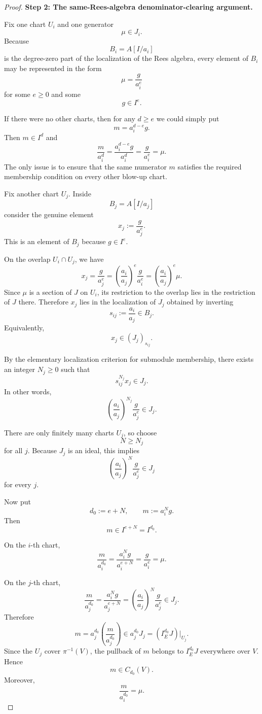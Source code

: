 \documentclass[11pt]{article}
\begin{document}
\begin{proof}
\medskip

\noindent
\textbf{Step 2: The same-Rees-algebra denominator-clearing argument.}

Fix one chart $U_i$ and one generator
\[
  \mu\in J_i.
\]
Because
\[
  B_i=A[I/a_i]
\]
is the degree-zero part of the localization of the Rees algebra, every element
of $B_i$ may be represented in the form
\[
  \mu=\frac{g}{a_i^e}
\]
for some $e\geq 0$ and some
\[
  g\in I^e.
\]

If there were no other charts, then for any $d\geq e$ we could simply put
\[
  m=a_i^{d-e}g.
\]
Then $m\in I^d$ and
\[
  \frac{m}{a_i^d}
  =
  \frac{a_i^{d-e}g}{a_i^d}
  =
  \frac{g}{a_i^e}
  =
  \mu.
\]
The only issue is to ensure that the same numerator $m$ satisfies the
required membership condition on every other blow-up chart.

Fix another chart $U_j$.
Inside
\[
  B_j=A[I/a_j]
\]
consider the genuine element
\[
  x_j:=\frac{g}{a_j^e}.
\]
This is an element of $B_j$ because $g\in I^e$.

On the overlap $U_i\cap U_j$, we have
\[
  x_j
  =
  \frac{g}{a_j^e}
  =
  \left(\frac{a_i}{a_j}\right)^e
  \frac{g}{a_i^e}
  =
  \left(\frac{a_i}{a_j}\right)^e\mu.
\]
Since $\mu$ is a section of $J$ on $U_i$, its restriction to the overlap lies
in the restriction of $J$ there.
Therefore $x_j$ lies in the localization of $J_j$ obtained by inverting
\[
  s_{ij}:=\frac{a_i}{a_j}\in B_j.
\]
Equivalently,
\[
  x_j\in (J_j)_{s_{ij}}.
\]

By the elementary localization criterion for submodule membership, there
exists an integer $N_j\geq 0$ such that
\[
  s_{ij}^{N_j}x_j\in J_j.
\]
In other words,
\[
  \left(\frac{a_i}{a_j}\right)^{N_j}
  \frac{g}{a_j^e}
  \in J_j.
\]

There are only finitely many charts $U_j$, so choose
\[
  N\geq N_j
\]
for all $j$.
Because $J_j$ is an ideal, this implies
\[
  \left(\frac{a_i}{a_j}\right)^N
  \frac{g}{a_j^e}
  \in J_j
\]
for every $j$.

Now put
\[
  d_0:=e+N,
  \qquad
  m:=a_i^Ng.
\]
Then
\[
  m\in I^{e+N}=I^{d_0}.
\]

On the $i$-th chart,
\[
  \frac{m}{a_i^{d_0}}
  =
  \frac{a_i^Ng}{a_i^{e+N}}
  =
  \frac{g}{a_i^e}
  =
  \mu.
\]

On the $j$-th chart,
\[
  \frac{m}{a_j^{d_0}}
  =
  \frac{a_i^Ng}{a_j^{e+N}}
  =
  \left(\frac{a_i}{a_j}\right)^N
  \frac{g}{a_j^e}
  \in J_j.
\]
Therefore
\[
  m
  =
  a_j^{d_0}
  \left(\frac{m}{a_j^{d_0}}\right)
  \in
  a_j^{d_0}J_j
  =
  (I_E^{d_0}J)|_{U_j}.
\]
Since the $U_j$ cover $\pi^{-1}(V)$, the pullback of $m$ belongs to
$I_E^{d_0}J$ everywhere over $V$.
Hence
\[
  m\in C_{d_0}(V).
\]
Moreover,
\[
  \frac{m}{a_i^{d_0}}=\mu.
\]


\end{proof}
\end{document}
